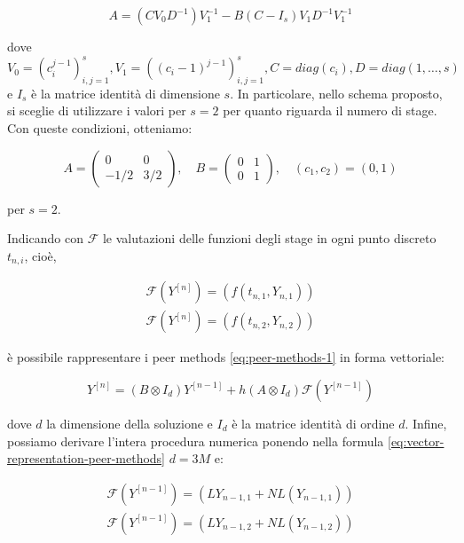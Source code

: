 \begin{equation*}
    A = (CV_0D^{-1})V_1^{-1}-B(C-I_s)V_1D^{-1}V_1^{-1}
\end{equation*}

\noindent dove $V_0 = (c_i^{j - 1})^s_{i,j=1},  V_1 = ((c_i-1)^{j - 1})^{s}_{i,j=1}, C=diag(c_i), D = diag(1, \ldots, s)$ e $I_s$ è la matrice identità di dimensione $s$. In particolare, nello schema proposto, si sceglie di utilizzare i valori per $s = 2$ per quanto riguarda il numero di stage. Con queste condizioni, otteniamo:

\begin{equation}
    A = 
    \begin{pmatrix}
        0 & 0 \\
        -1/2 & 3/2
    \end{pmatrix},
    \quad
    B = 
    \begin{pmatrix}
        0 & 1 \\
        0 & 1
    \end{pmatrix},
    \quad
    (c_1, c_2) = (0, 1)
    \label{eq:ABc-equation}
\end{equation}

\noindent per $s = 2$.

\noindent Indicando con $\mathcal{F}$ le valutazioni delle funzioni degli stage in ogni punto discreto $t_{n,i}$, cioè,

\begin{gather*}
    \mathcal{F}(Y^{[n]})=(f(t_{n,1}, Y_{n,1})) \\
    \mathcal{F}(Y^{[n]})=(f(t_{n,2}, Y_{n,2})) 
\end{gather*}

\noindent è possibile rappresentare i peer methods \eqref{eq:peer-methods-1} in forma vettoriale:

\begin{equation}
    Y^{[n]} = (B \otimes I_d)Y^{[n - 1]} + h(A \otimes I_d) \mathcal{F}(Y^{[n - 1]})
    \label{eq:vector-representation-peer-methods}
\end{equation}

\noindent dove $d$ la dimensione della soluzione e $I_d$ è la matrice identità di ordine $d$. Infine, possiamo derivare l'intera procedura numerica ponendo nella formula \eqref{eq:vector-representation-peer-methods} $d = 3M$ e:

\begin{gather}
    \mathcal{F}(Y^{[n - 1]}) = (LY_{n - 1,1}+NL(Y_{n - 1,1})) \nonumber \\
    \mathcal{F}(Y^{[n - 1]}) = (LY_{n - 1,2}+NL(Y_{n - 1,2}))
    \label{eq:FYnm1-equation}
\end{gather}

